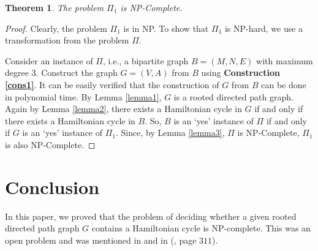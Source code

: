 \documentclass[a4paper,12pt]{article}
\theoremstyle{plain}
\newtheorem{theorem}{Theorem}[section]
\theoremstyle{definition}
\theoremstyle{remark}
\begin{document}
\begin{theorem}
The problem $\Pi_1$ is NP-Complete.
\end{theorem}
\begin{proof}
Clearly, the problem $\Pi_1$ is in NP. To show that $\Pi_1$ is
NP-hard, we use a transformation from the problem $\Pi$.

Consider an instance of $\Pi$, i.e., a bipartite graph $B=(M,N,E)$
with maximum degree $3$. Construct the graph $G=(V,A)$ from $B$
using {\bf Construction \ref{cons1}}. It can be easily verified that
the construction of $G$ from $B$ can be done in polynomial time. By
Lemma \ref{lemma1}, $G$ is a rooted directed path graph. Again by
Lemma \ref{lemma2}, there exists a Hamiltonian cycle in $G$ if and
only if there exists a Hamiltonian cycle in $B$. So, $B$ is an `yes'
instance of $\Pi$ if and only if $G$ is an `yes' instance of
$\Pi_1$. Since, by Lemma \ref{lemma3}, $\Pi$ is NP-Complete, $\Pi_1$
is also NP-Complete.

\end{proof}

\section{Conclusion} In this paper, we proved that the problem of
deciding whether a given rooted directed path graph $G$ contains a
Hamiltonian cycle is NP-complete. This was an open problem and was
mentioned in \cite{giri} and in (\cite {spinrad}, page $311$).
\end{document}
